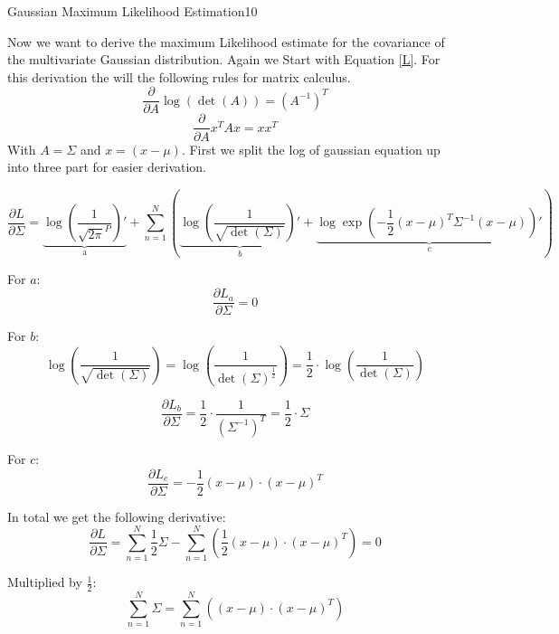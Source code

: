 \begin{questions}
\begin{question}{Gaussian Maximum Likelihood Estimation}{10}
\begin{answer}
Now we want to derive the maximum Likelihood estimate for the covariance of the multivariate Gaussian distribution. Again we Start with Equation \eqref{L}.
For this derivation the will the following rules for matrix calculus.
\begin{equation}
	\frac{\partial}{\partial A} \log(\det(A)) = (A^{-1})^T
\end{equation}
\begin{equation}
	\frac{\partial}{\partial A}x^T A x = xx^T
\end{equation}
With $A = \Sigma$ and $x = (x-\mu)$.
First we split the log of gaussian equation up into three part for easier derivation.

\begin{equation}
\frac{\partial L}{\partial \Sigma} = \underbrace{\log(\frac{1}{\sqrt{2\pi}^P})'}_{\text{a}} + \sum_{n=1}^{N}(\underbrace{\log(\frac{1}{\sqrt{\det(\Sigma)}})'}_{b} + \underbrace{\log \exp (-\frac{1}{2} (x-\mu)^T \Sigma^{-1}(x-\mu))'}_{c}) 
\end{equation}

For $a$:
\begin{equation}
	\frac{\partial L_a}{\partial \Sigma} = 0
\end{equation}

For $b$:
\begin{equation}
	\log(\frac{1}{\sqrt{\det(\Sigma)}}) = \log(\frac{1}{\det(\Sigma)^{\frac{1}{2}}}) = \frac{1}{2}\cdot\log(\frac{1}{\det(\Sigma)})
\end{equation}

\begin{equation}
\frac{\partial L_b}{\partial \Sigma} = \frac{1}{2}\cdot\frac{1}{(\Sigma^{-1})^T} = \frac{1}{2} \cdot \Sigma
\end{equation}

For $c$:
\begin{equation}
	\frac{\partial L_c}{\partial \Sigma} = -\frac{1}{2}(x - \mu)\cdot(x - \mu)^T 
\end{equation}

In total we get the following derivative:
\begin{equation}
	\frac{\partial L}{\partial \Sigma} = \sum_{n=1}^{N}\frac{1}{2}\Sigma - \sum_{n=1}^{N}(\frac{1}{2}(x - \mu)\cdot(x - \mu)^T) = 0
\end{equation}

Multiplied by $\frac{1}{2}$:
\begin{equation}
	\sum_{n=1}^{N} \Sigma = \sum_{n=1}^{N}((x - \mu)\cdot(x - \mu)^T)
\end{equation}


\end{answer}
\end{question}
\end{questions}

